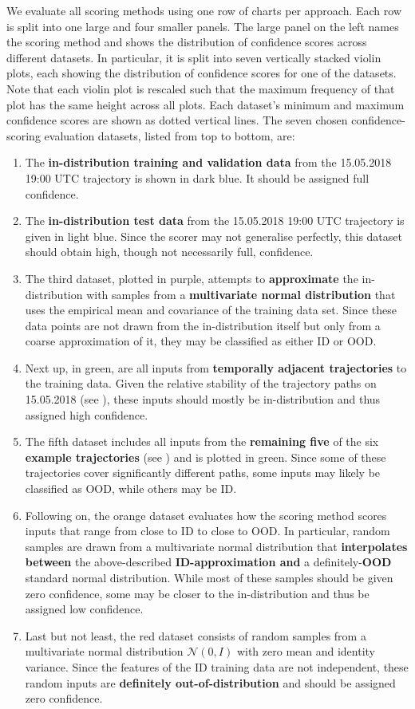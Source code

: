 \newpar We evaluate all scoring methods using one row of charts per approach. Each row is split into one large and four smaller panels. The large panel on the left names the scoring method and shows the distribution of confidence scores across different datasets. In particular, it is split into seven vertically stacked violin plots, each showing the distribution of confidence scores for one of the datasets. Note that each violin plot is rescaled such that the maximum frequency of that plot has the same height across all plots. Each dataset's minimum and maximum confidence scores are shown as dotted vertical lines. The seven chosen confidence-scoring evaluation datasets, listed from top to bottom, are:
\begin{enumerate}
    \item The \textbf{in-distribution training and validation data} from the 15.05.2018 19:00 UTC trajectory is shown in dark blue. It should be assigned full confidence.
    \item The \textbf{in-distribution test data} from the 15.05.2018 19:00 UTC trajectory is given in light blue. Since the scorer may not generalise perfectly, this dataset should obtain high, though not necessarily full, confidence.
    \item The third dataset, plotted in purple, attempts to \textbf{approximate} the in-distribution with samples from a \textbf{multivariate normal distribution} that uses the empirical mean and covariance of the training data set. Since these data points are not drawn from the in-distribution itself but only from a coarse approximation of it, they may be classified as either ID or OOD. 
    \item Next up, in green, are all inputs from \textbf{temporally adjacent trajectories} to the training data. Given the relative stability of the trajectory paths on 15.05.2018 (see ), these inputs should mostly be in-distribution and thus assigned high confidence.
    \item The fifth dataset includes all inputs from the \textbf{remaining five} of the six \textbf{example trajectories} (see ) and is plotted in green. Since some of these trajectories cover significantly different paths, some inputs may likely be classified as OOD, while others may be ID.
    \item Following on, the orange dataset evaluates how the scoring method scores inputs that range from close to ID to close to OOD. In particular, random samples are drawn from a multivariate normal distribution that \textbf{interpolates between} the above-described \textbf{ID-approximation and} a definitely-\textbf{OOD} standard normal distribution. While most of these samples should be given zero confidence, some may be closer to the in-distribution and thus be assigned low confidence.
    \item Last but not least, the red dataset consists of random samples from a multivariate normal distribution $\mathcal{N}(0, I)$ with zero mean and identity variance. Since the features of the ID training data are not independent, these random inputs are \textbf{definitely out-of-distribution} and should be assigned zero confidence.
\end{enumerate}
